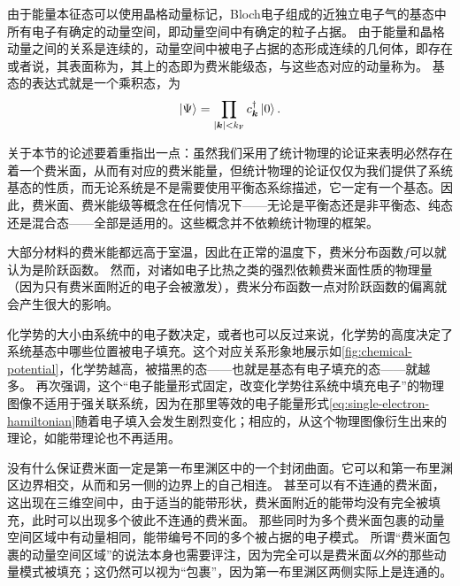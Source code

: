 由于能量本征态可以使用晶格动量标记，Bloch电子组成的近独立电子气的基态中所有电子有确定的动量空间，即动量空间中有确定的粒子占据。
由于能量和晶格动量之间的关系是连续的，动量空间中被电子占据的态形成连续的几何体，即存在或者说，其表面称为，其上的态即为费米能级态，与这些态对应的动量称为。
基态的表达式就是一个乘积态，为
\begin{equation}
    \ket{\Psi} = \prod_{\abs{\vb*{k}} < k_\text{F}} {c}^\dagger_{\vb*{k}} \ket{0}.
    \label{eq:ground-state}
\end{equation}

关于本节的论述要着重指出一点：虽然我们采用了统计物理的论证来表明必然存在着一个费米面，从而有对应的费米能量，但统计物理的论证仅仅为我们提供了系统基态的性质，而无论系统是不是需要使用平衡态系综描述，它一定有一个基态。因此，费米面、费米能级等概念在任何情况下——无论是平衡态还是非平衡态、纯态还是混合态——全部是适用的。这些概念并不依赖统计物理的框架。

大部分材料的费米能都远高于室温，因此在正常的温度下，费米分布函数$f$可以就认为是阶跃函数。
然而，对诸如电子比热之类的强烈依赖费米面性质的物理量（因为只有费米面附近的电子会被激发），费米分布函数一点对阶跃函数的偏离就会产生很大的影响。

化学势的大小由系统中的电子数决定，或者也可以反过来说，化学势的高度决定了系统基态中哪些位置被电子填充。这个对应关系形象地展示如\autoref{fig:chemical-potential}，化学势越高，被描黑的态——也就是基态有电子填充的态——就越多。
再次强调，这个“电子能量形式固定，改变化学势往系统中填充电子”的物理图像不适用于强关联系统，因为在那里等效的电子能量形式\eqref{eq:single-electron-hamiltonian}随着电子填入会发生剧烈变化；相应的，从这个物理图像衍生出来的理论，如能带理论也不再适用。

没有什么保证费米面一定是第一布里渊区中的一个封闭曲面。它可以和第一布里渊区边界相交，从而和另一侧的边界上的自己相连。
甚至可以有不连通的费米面，这出现在三维空间中，由于适当的能带形状，费米面附近的能带均没有完全被填充，此时可以出现多个彼此不连通的费米面。
那些同时为多个费米面包裹的动量空间区域中有动量相同，能带编号不同的多个被占据的电子模式。
所谓“费米面包裹的动量空间区域”的说法本身也需要评注，因为完全可以是费米面\emph{以外}的那些动量模式被填充；这仍然可以视为“包裹”，因为第一布里渊区两侧实际上是连通的。

